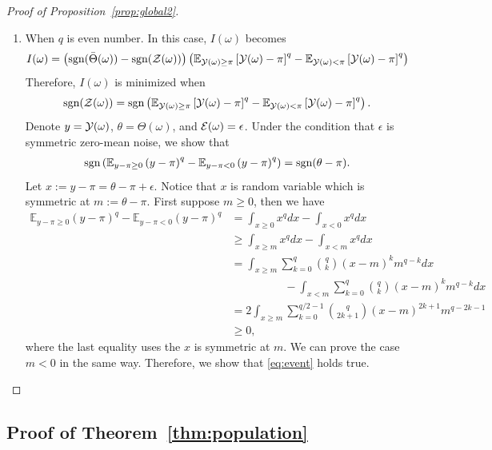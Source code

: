 \documentclass[twoside,11pt]{article}
\theoremstyle{plain}
\theoremstyle{definition}
\def\sign{\textup{sgn}}
\begin{document}
\begin{proof}[Proof of Proposition~\ref{prop:global2}]
\begin{enumerate}
    \item When $q$ is even number. In this case, $I(\omega)$ becomes
    \begin{align}
         I(\omega)  &=  
        \left(\sign(\bar\Theta(\omega))-\sign(\tZ(\omega))\right)\left(\mathbb{E}_{\tY(\omega)\geq \pi}\left[\tY(\omega)-\pi\right]^q-\mathbb{E}_{\tY(\omega)< \pi}\left[\tY(\omega)-\pi\right]^q\right)
    \end{align}
    Therefore, $I(\omega)$ is minimized when
    \begin{align}\label{eq:event}
        \sign(\tZ(\omega)) = \sign\left(\mathbb{E}_{\tY(\omega)\geq \pi}\left[\tY(\omega)-\pi\right]^q-\mathbb{E}_{\tY(\omega)< \pi}\left[\tY(\omega)-\pi\right]^q\right).
    \end{align}
    Denote $y=\mathcal{Y}(\omega)$, $\theta = \Theta(\omega)$, and $\mathcal{E}(\omega) = \epsilon$.
    Under the condition that $\epsilon$ is symmetric zero-mean noise, we show that
    \begin{align}\label{eq:even}
        \sign\left(\mathbb{E}_{y-\pi\geq 0}\left(y-\pi\right)^q-\mathbb{E}_{y-\pi<0}\left(y-\pi\right)^q\right) = \sign(\theta-\pi).
    \end{align}
    Let $x := y-\pi = \theta-\pi+\epsilon$. Notice that $x$ is random variable which is symmetric at $m:= \theta-\pi$. First suppose $m\geq0$, then we have
    \begin{align}
      \mathbb{E}_{y-\pi\geq 0}\left(y-\pi\right)^q-\mathbb{E}_{y-\pi<0}\left(y-\pi\right)^q &=  \int_{x\geq 0}x^qdx-\int_{x<0}x^qdx\\&\geq \int_{x\geq m}x^qdx-\int_{x<m}x^qdx \\&=\int_{x\geq m}\sum_{k=0}^q{q\choose k}(x-m)^k m^{q-k}dx\\&\hspace{2cm}-\int_{x<m}\sum_{k=0}^q{q\choose k}(x-m)^{k}m^{q-k}dx\\&= 2\int_{x\geq m}\sum_{k=0}^{q/2-1}{q\choose 2k+1}(x-m)^{2k+1}m^{q-2k-1}\\&\geq 0,
    \end{align}
    where the last equality uses the $x$ is symmetric at $m$. We can prove the case $m<0$ in the same way.
    Therefore, we show that \eqref{eq:event} holds true.
    
\end{enumerate}
\end{proof}

\subsection{Proof of Theorem~\ref{thm:population}}
\end{document}

